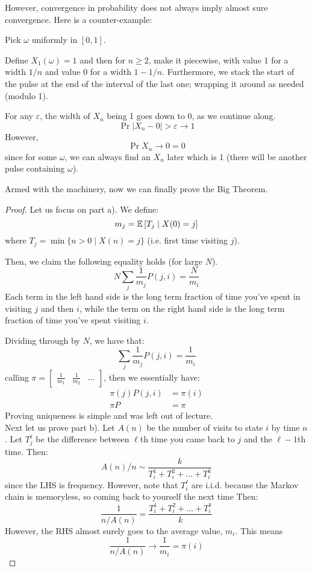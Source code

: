 However, convergence in probability does not always imply almost sure convergence. Here is a counter-example:

\begin{example} 
    Pick $\omega$ uniformly in $[0, 1]$.

    Define $X_1(\omega) = 1$ and then for $n \geq 2$, make it piecewise, with value 1 for a width $1/n$ and value
    0 for a width $1 - 1/n$. Furthermore, we stack the start of the pulse at the end of the interval of the last one; wrapping it around as
    needed (modulo 1).

    For any $\varepsilon$, the width of $X_n$ being 1 goes down to 0, as we continue along.
    \[ \Pr{|X_n - 0| > \varepsilon} \to 1 \]
    However,
    \[\Pr{X_n \to 0} = 0\]
    since for some $\omega$, we can always find an $X_n$ later which is 1 (there will be another pulse containing $\omega$).
\end{example}

Armed with the machinery, now we can finally prove the Big Theorem.

\begin{proof}
    Let us focus on part a).
    We define:
    \[ m_j = \mathbb{E}\left[ T_j \mid X(0) = j \right] \]
    where $T_j = \min\{n > 0 \mid X(n) = j\}$ (i.e. first time visiting $j$).

    Then, we claim the following equality holds (for large $N$).
    \[ N \sum_j \frac{1}{m_j} P(j, i) = \frac{N}{m_i} \]
    Each term in the left hand side is the long term fraction of time you've spent in visiting $j$ and then $i$,
    while the term on the right hand side is the long term fraction of time you've spent visiting $i$.

    Dividing through by $N$, we have that:
    \[ \sum_j \frac{1}{m_j} P(j, i) = \frac{1}{m_i} \]
    calling $\pi = \begin{bmatrix}
        \frac{1}{m_1} & \frac{1}{m_2} & \dots
    \end{bmatrix}$, then we essentially have:
    \begin{align*}
        \pi(j) P(j, i) &= \pi(i) \\
        \pi P &= \pi
    \end{align*}
    Proving uniqueness is simple and was left out of lecture.
\\

    Next let us prove part b).
    Let $A(n)$ be the number of visits to state $i$ by time $n$.
    Let $T_j^{\ell}$ be the difference between $\ell$th time you came back to $j$ and the $\ell -1$th time. Then:
    \[ A(n)/n \sim \frac{k}{T_i^1 + T_i^2 + \dots + T_i^k} \]
    since the LHS is frequency.
    However, note that $T_i^{\ell}$ are i.i.d. because the Markov chain is memoryless, so coming back to yourself the next time
    Then:
    \[ \frac{1}{n/A(n)} = \frac{T_i^1 + T_i^2 + \dots + T_i^k}{k} \]
    However, the RHS almost surely goes to the average value, $m_i$. This means
    \[ \frac{1}{n/A(n)} \to \frac{1}{m_i} = \pi(i) \]
\end{proof}

